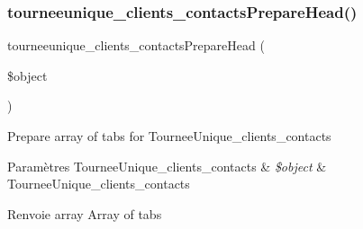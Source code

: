 \subsubsection{\texorpdfstring{tourneeunique\+\_\+clients\+\_\+contacts\+Prepare\+Head()}{tourneeunique\_clients\_contactsPrepareHead()}}
{\footnotesize\ttfamily tourneeunique\+\_\+clients\+\_\+contacts\+Prepare\+Head (\begin{DoxyParamCaption}\item[{}]{\$object }\end{DoxyParamCaption})}

Prepare array of tabs for Tournee\+Unique\+\_\+clients\+\_\+contacts


\begin{DoxyParams}[1]{Paramètres}
Tournee\+Unique\+\_\+clients\+\_\+contacts & {\em \$object} & Tournee\+Unique\+\_\+clients\+\_\+contacts \\
\hline
\end{DoxyParams}
\begin{DoxyReturn}{Renvoie}
array Array of tabs 
\end{DoxyReturn}
